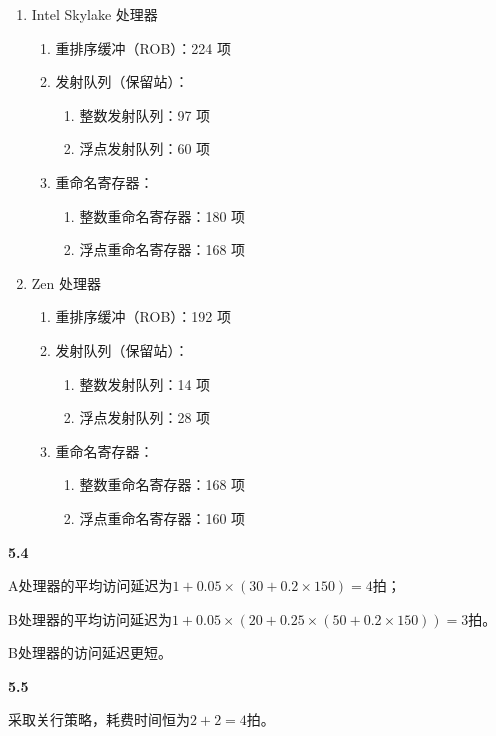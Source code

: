 \documentclass[UTF8]{report}
\begin{document}
\begin{enumerate}
    \item Intel Skylake 处理器
    \begin{enumerate}
        \item 重排序缓冲（ROB）：224 项
        \item 发射队列（保留站）：
        \begin{enumerate}
            \item 整数发射队列：97 项
            \item 浮点发射队列：60 项
        \end{enumerate}
        \item 重命名寄存器：
        \begin{enumerate}
            \item 整数重命名寄存器：180 项
            \item 浮点重命名寄存器：168 项
        \end{enumerate}
    \end{enumerate}
    \item Zen 处理器
    \begin{enumerate}
        \item 重排序缓冲（ROB）：192 项
        \item 发射队列（保留站）：
        \begin{enumerate}
            \item 整数发射队列：14 项
            \item 浮点发射队列：28 项
        \end{enumerate}
        \item 重命名寄存器：
        \begin{enumerate}
            \item 整数重命名寄存器：168 项
            \item 浮点重命名寄存器：160 项
        \end{enumerate}
    \end{enumerate}
\end{enumerate}

\noindent
\textbf{5.4}

A处理器的平均访问延迟为$1 + 0.05 \times (30 + 0.2 \times 150) = 4$拍；

B处理器的平均访问延迟为$1 + 0.05 \times (20 + 0.25 \times (50 + 0.2 \times 150)) = 3$拍。

B处理器的访问延迟更短。

\noindent
\textbf{5.5}

采取关行策略，耗费时间恒为$2 + 2 = 4$拍。
\end{document}
